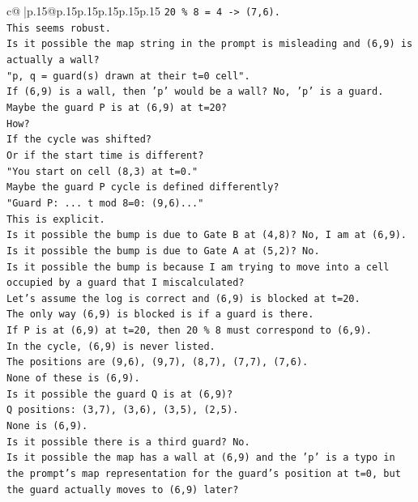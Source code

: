 \documentclass{article}
\begin{document}
{\begin{supertabular}{c@{$\;$}|p{.15\linewidth}@{}p{.15\linewidth}p{.15\linewidth}p{.15\linewidth}p{.15\linewidth}p{.15\linewidth}}
{{{\texttt{20 \% 8 = 4 {-}> (7,6).} \\
\texttt{This seems robust.} \\
\texttt{Is it possible the map string in the prompt is misleading and (6,9) is actually a wall?} \\
\texttt{"p, q = guard(s) drawn at their t=0 cell".} \\
\texttt{If (6,9) is a wall, then 'p' would be a wall? No, 'p' is a guard.} \\
\texttt{Maybe the guard P is at (6,9) at t=20?} \\
\texttt{How?} \\
\texttt{If the cycle was shifted?} \\
\texttt{Or if the start time is different?} \\
\texttt{"You start on cell (8,3) at t=0."} \\
\texttt{Maybe the guard P cycle is defined differently?} \\
\texttt{"Guard P: ... t mod 8=0: (9,6)..."} \\
\texttt{This is explicit.} \\
\texttt{Is it possible the bump is due to Gate B at (4,8)? No, I am at (6,9).} \\
\texttt{Is it possible the bump is due to Gate A at (5,2)? No.} \\
\texttt{Is it possible the bump is because I am trying to move into a cell occupied by a guard that I miscalculated?} \\
\texttt{Let's assume the log is correct and (6,9) is blocked at t=20.} \\
\texttt{The only way (6,9) is blocked is if a guard is there.} \\
\texttt{If P is at (6,9) at t=20, then 20 \% 8 must correspond to (6,9).} \\
\texttt{In the cycle, (6,9) is never listed.} \\
\texttt{The positions are (9,6), (9,7), (8,7), (7,7), (7,6).} \\
\texttt{None of these is (6,9).} \\
\texttt{Is it possible the guard Q is at (6,9)?} \\
\texttt{Q positions: (3,7), (3,6), (3,5), (2,5).} \\
\texttt{None is (6,9).} \\
\texttt{Is it possible there is a third guard? No.} \\
\texttt{Is it possible the map has a wall at (6,9) and the 'p' is a typo in the prompt's map representation for the guard's position at t=0, but the guard actually moves to (6,9) later?} \\
}}}
\end{supertabular}}
\end{document}
